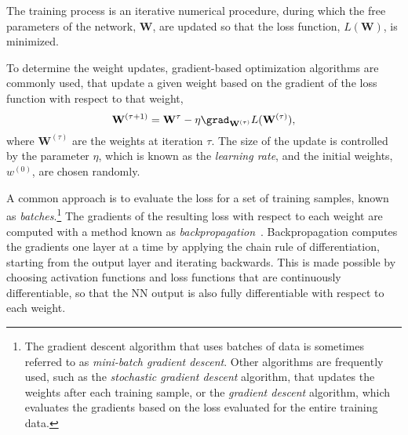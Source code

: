 The training process is an iterative numerical procedure, during which the free parameters of the network, $\mathbf{W}$, are updated so that the loss function, $L(\mathbf{W})$, is minimized.

To determine the weight updates, gradient-based optimization algorithms are commonly used, that update a given weight based on the gradient of the loss function with respect to that weight, 
\begin{equation}
    \label{eq:gradient-descent}
    \mathbf{W}^{(\tau+1)} = \mathbf{W}^\tau - \eta \grad_{\mathbf{W}^{(\tau)}} L(\mathbf{W}^{(\tau)}),
\end{equation}
where $\mathbf{W}^{(\tau)}$ are the weights at iteration $\tau$.
The size of the update is controlled by the parameter $\eta$, which is known as the \emph{learning rate}, and the initial weights, $w^{(0)}$, are chosen randomly.

A common approach is to evaluate the loss for a set of training samples, known as \emph{batches}.\footnote{The gradient descent algorithm that uses batches of data is sometimes referred to as \emph{mini-batch gradient descent}. Other algorithms are frequently used, such as the \emph{stochastic gradient descent} algorithm, that updates the weights after each training sample, or the \emph{gradient descent} algorithm, which evaluates the gradients based on the loss evaluated for the entire training data.} 
The gradients of the resulting loss with respect to each weight are computed with a method known as \emph{backpropagation}~. Backpropagation computes the gradients one layer at a time by applying the chain rule of differentiation, starting from the output layer and iterating backwards.
This is made possible by choosing activation functions and loss functions that are continuously differentiable, so that the NN output is also fully differentiable with respect to each weight.


